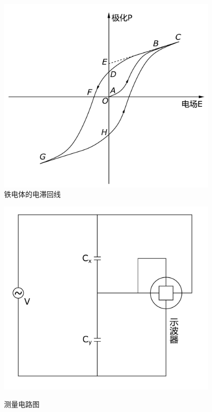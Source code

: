 \documentclass[a4paper]{article}
\begin{document}
\begin{figure}[!h]
    \begin{minipage}{0.48\textwidth}
        \begin{center}
            \includegraphics[width=0.95\textwidth]{fig/fig3.pdf}\\
            \caption{铁电体的电滞回线}\label{fig3}
        \end{center}
    \end{minipage}
    \begin{minipage}{0.48\textwidth}
        \begin{center}
            \includegraphics[width=0.95\textwidth]{fig/fig4.pdf}\\
            \caption{测量电路图}\label{fig4}
        \end{center}
    \end{minipage}
\end{figure}
\end{document}
